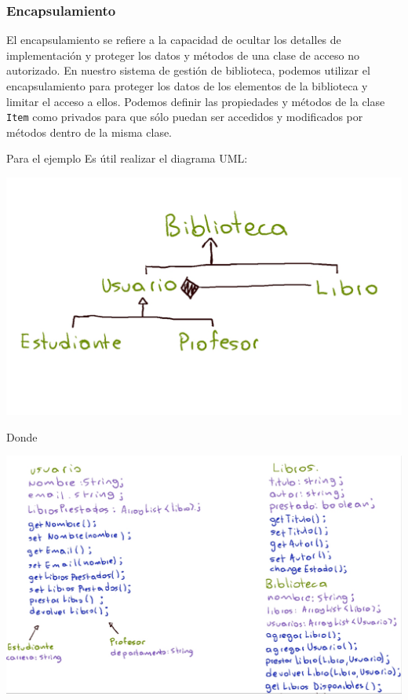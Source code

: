 \documentclass[executivepaper]{article}
\begin{document}
\subsubsection*{Encapsulamiento}

El encapsulamiento se refiere a la capacidad de ocultar los detalles de implementación y proteger los datos y métodos de una clase de acceso no autorizado. En nuestro sistema de gestión de biblioteca, podemos utilizar el encapsulamiento para proteger los datos de los elementos de la biblioteca y limitar el acceso a ellos. Podemos definir las propiedades y métodos de la clase \texttt{Item} como privados para que sólo puedan ser accedidos y modificados por métodos dentro de la misma clase.

Para el ejemplo Es útil realizar el diagrama UML:\\
\begin{center}
    \includegraphics[scale=0.2]{3.1.png}\\ 
\end{center}
Donde\\
\begin{center}
    \includegraphics[scale=0.3]{3.2.png}\\ 
\end{center}
\end{document}
